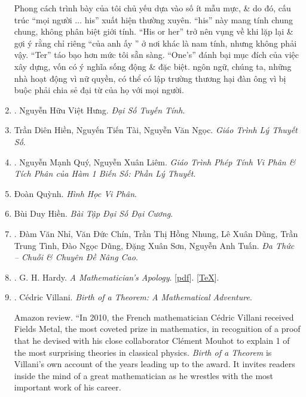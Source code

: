 \documentclass{article}
\begin{document}
\begin{enumerate}
	Phong cách trình bày của tôi chủ yếu dựa vào số ít mẫu mực, \& do đó, cấu trúc ``mọi người $\ldots$ his'' xuất hiện thường xuyên. ``his'' này mang tính chung chung, không phân biệt giới tính. ``His or her'' trở nên vụng về khi lặp lại \& gợi ý rằng chỉ riêng ``của anh ấy '' ở nơi khác là nam tính, nhưng không phải vậy. ``Ter'' táo bạo hơn mức tôi sẵn sàng. ``One's'' đánh bại mục đích của việc xây dựng, vốn có ý nghĩa sống động \& đặc biệt. ngôn ngữ, chúng ta, những nhà hoạt động vì nữ quyền, có thể có lập trường thương hại đàn ông vì bị buộc phải chia sẻ đại từ của họ với mọi người.
	
	\item \cite{Hung_linear_algebra}. {\sc Nguyễn Hữu Việt Hưng}. {\it Đại Số Tuyến Tính}.\hfill{\sf[reading]}
	
	\item Trần Diên Hiền, Nguyến Tiến Tài, Nguyễn Văn Ngọc. {\it Giáo Trình Lý Thuyết Số}.
	
	\item \cite{Quy_Liem2012}. Nguyễn Mạnh Quý, Nguyễn Xuân Liêm. {\it Giáo Trình Phép Tính Vi Phân \& Tích Phân của Hàm 1 Biến Số: Phần Lý Thuyết}.\hfill{\sf[reading]}
	
	\item Đoàn Quỳnh. {\it Hình Học Vi Phân}.
	
	\item Bùi Duy Hiền. {\it Bài Tập Đại Số Đại Cương}.
	
	\item \cite{Nhi_Chin_Dung_Dung_Tinh_Dung_Son_Tuan2017}. Đàm Văn Nhỉ, Văn Đức Chín, Trần Thị Hồng Nhung, Lê Xuân Dũng, Trần Trung Tình, Đào Ngọc Dũng, Đặng Xuân Sơn, Nguyễn Anh Tuấn. {\it Đa Thức -- Chuỗi \& Chuyên Đề Nâng Cao}.
	
	\item \cite{Hardy1940, Hardy1992, Hardy2022}. G. H. Hardy. {\it A Mathematician's Apology}. [\href{https://github.com/NQBH/hobby/blob/master/advanced_mathematics/Hardy2017/NQBH_Hardy2017.pdf}{pdf}]. [\href{https://github.com/NQBH/hobby/blob/master/advanced_mathematics/Hardy2017/NQBH_Hardy2017.tex}{\TeX}].\hfill{\sf[done]}
	
	\item \cite{Villani2015}. {\sc C\'edric Villani}. {\it Birth of a Theorem: A Mathematical Adventure}. {}
	
	{\sf Amazon review.} ``In 2010, the French mathematician {\sc C\'edric Villani} received Fields Metal, the most coveted prize in mathematics, in recognition of a proof that he devised with his close collaborator {\sc Cl\'ement Mouhot} to explain 1 of the most surprising theories in classical physics. {\it Birth of a Theorem} is {\sc Villani}'s own account of the years leading up to the award. It invites readers inside the mind of a great mathematician as he wrestles with the most important work of his career.
	

\end{enumerate}
\end{document}

